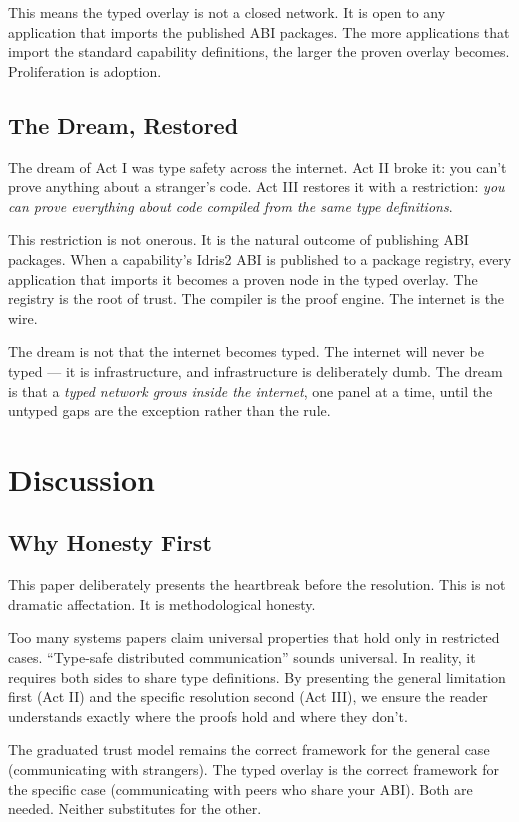 \documentclass[11pt,a4paper]{article}
\begin{document}
This means the typed overlay is not a closed network. It is open to any
application that imports the published ABI packages. The more
applications that import the standard capability definitions, the larger
the proven overlay becomes. Proliferation is adoption.

\subsection{The Dream, Restored}

The dream of Act I was type safety across the internet. Act II broke it:
you can't prove anything about a stranger's code. Act III restores it
with a restriction: \emph{you can prove everything about code compiled
from the same type definitions}.

This restriction is not onerous. It is the natural outcome of
publishing ABI packages. When a capability's Idris2 ABI is published to
a package registry, every application that imports it becomes a proven
node in the typed overlay. The registry is the root of trust. The
compiler is the proof engine. The internet is the wire.

The dream is not that the internet becomes typed. The internet will
never be typed --- it is infrastructure, and infrastructure is
deliberately dumb. The dream is that a \emph{typed network grows inside
the internet}, one panel at a time, until the untyped gaps are the
exception rather than the rule.

\section{Discussion}

\subsection{Why Honesty First}

This paper deliberately presents the heartbreak before the resolution.
This is not dramatic affectation. It is methodological honesty.

Too many systems papers claim universal properties that hold only in
restricted cases. ``Type-safe distributed communication'' sounds
universal. In reality, it requires both sides to share type definitions.
By presenting the general limitation first (Act II) and the specific
resolution second (Act III), we ensure the reader understands exactly
where the proofs hold and where they don't.

The graduated trust model remains the correct framework for the general
case (communicating with strangers). The typed overlay is the correct
framework for the specific case (communicating with peers who share your
ABI). Both are needed. Neither substitutes for the other.
\end{document}
